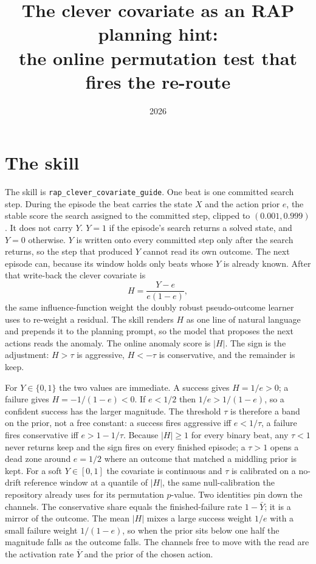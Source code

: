 \documentclass[11pt,a4paper]{article}
\title{The clever covariate as an RAP planning hint:\\
the online permutation test that fires the re-route}
\author{}
\date{2026}
\begin{document}
\maketitle
\section{The skill}
The skill is \texttt{rap\_clever\_covariate\_guide}.
One beat is one committed search step.
During the episode the beat carries the state \(X\) and the action prior \(e\), the stable score the search assigned to the committed step, clipped to \((0.001,0.999)\).
It does not carry \(Y\).
\(Y=1\) if the episode's search returns a solved state, and \(Y=0\) otherwise.
\(Y\) is written onto every committed step only after the search returns, so the step that produced \(Y\) cannot read its own outcome.
The next episode can, because its window holds only beats whose \(Y\) is already known.
After that write-back the clever covariate is
\[
H=\frac{Y-e}{e(1-e)},
\]
the same influence-function weight the doubly robust pseudo-outcome learner uses to re-weight a residual.
The skill renders \(H\) as one line of natural language and prepends it to the planning prompt, so the model that proposes the next actions reads the anomaly.
The online anomaly score is \(|H|\).
The sign is the adjustment: \(H>\tau\) is aggressive, \(H<-\tau\) is conservative, and the remainder is keep.

For \(Y\in\{0,1\}\) the two values are immediate.
A success gives \(H=1/e>0\); a failure gives \(H=-1/(1-e)<0\).
If \(e<1/2\) then \(1/e>1/(1-e)\), so a confident success has the larger magnitude.
The threshold \(\tau\) is therefore a band on the prior, not a free constant: a success fires aggressive iff \(e<1/\tau\), a failure fires conservative iff \(e>1-1/\tau\).
Because \(|H|\ge 1\) for every binary beat, any \(\tau<1\) never returns keep and the sign fires on every finished episode; a \(\tau>1\) opens a dead zone around \(e=1/2\) where an outcome that matched a middling prior is kept.
For a soft \(Y\in[0,1]\) the covariate is continuous and \(\tau\) is calibrated on a no-drift reference window at a quantile of \(|H|\), the same null-calibration the repository already uses for its permutation \(p\)-value.
Two identities pin down the channels.
The conservative share equals the finished-failure rate \(1-\bar Y\); it is a mirror of the outcome.
The mean \(|H|\) mixes a large success weight \(1/e\) with a small failure weight \(1/(1-e)\), so when the prior sits below one half the magnitude falls as the outcome falls.
The channels free to move with the read are the activation rate \(\bar Y\) and the prior of the chosen action.
\end{document}
